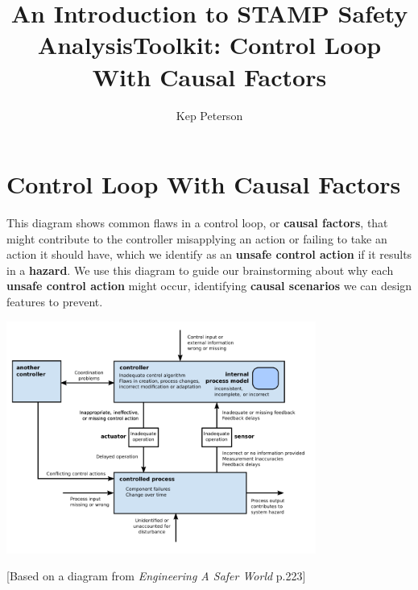 \documentclass{tufte-handout}
\title{An Introduction to STAMP Safety Analysis}
\author[Kep Peterson]{Kep Peterson}
\title{Toolkit: Control Loop With Causal Factors}
\begin{document}
\setlength{\parindent}{0em}
\setlength{\parskip}{.75em}



%
%

\section{Control Loop With Causal Factors}

This diagram shows common flaws in a control loop, or \textbf{causal factors}, that might contribute to the controller misapplying an action or failing to take an action it should have, which we identify as an \textbf{unsafe control action} if it results in a \textbf{hazard}. We use this diagram to guide our brainstorming about why each \textbf{unsafe control action} might occur, identifying \textbf{causal scenarios} we can design features to prevent.

\begin{fullwidth}
\begin{center}
\includegraphics[width=4in]{../images/generic_control_loop-flaws.png}
\end{center}
\end{fullwidth}

[Based on a diagram from \emph{Engineering A Safer World} p.223]
\end{document}
